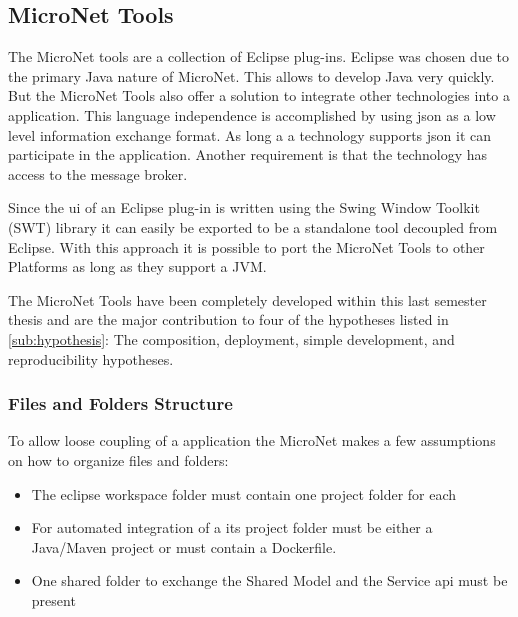 \subsection{MicroNet Tools}
\label{sub:tools}

The MicroNet tools are a collection of Eclipse plug-ins. Eclipse was chosen due
to the primary Java nature of MicroNet. This allows to develop Java \mss{} very
quickly. But the MicroNet Tools also offer a solution to integrate other
technologies into a \ms{} application. This language independence is
accomplished by using \gls{json} as a low level information exchange format. As
long a a technology supports \gls{json} it can participate in the application.
Another requirement is that the technology has access to the message broker.

Since the \gls{ui} of an Eclipse plug-in is written using the Swing
Window Toolkit (SWT) library it can easily be exported to be a standalone tool
decoupled from Eclipse. With this approach it is possible to port the MicroNet
Tools to other Platforms as long as they support a JVM.

The MicroNet Tools have been completely developed within this last semester
thesis and are the major contribution to four of the hypotheses listed in
\autoref{sub:hypothesis}: The composition, deployment, simple development, and 
reproducibility hypotheses.

\subsubsection{Files and Folders Structure}

To allow loose coupling of a \ms{} application the MicroNet makes a few
assumptions on how to organize files and folders:

\begin{itemize}
  \item The eclipse workspace folder must contain one project folder for each
  \ms{}
  \item For automated integration of a \ms{} its project folder must be either a
  Java/Maven project or must contain a Dockerfile.
 \item One shared folder to exchange the Shared Model and the Service \gls{api}
 must be present
\end{itemize}  

